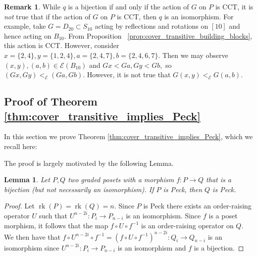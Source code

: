 \documentclass[10 pt]{amsart}
\theoremstyle{plain}
\newtheorem{lem}[thm]{Lemma}
\theoremstyle{definition}
\newtheorem{rem}[thm]{Remark}
\theoremstyle{remark}
\numberwithin{equation}{section}
\newcommand\ssec{\subsection}
\newcommand\rk{\operatorname{rk}}
\begin{document}
\begin{rem}
While $q$ is a bijection if and only if the action of $G$ on $P$ is CCT, it is {\it not} true that if the action of $G$ on $P$ is CCT, then $q$ is an isomorphism.  For example, take $G=D_{20} \subset S_{10}$ acting by reflections and rotations on $[10]$ and hence acting on $B_{10}.$ From Proposition ~\ref{prop:cover_transitive_building_blocks}, this action is CCT. However, consider $x = \{2,4\},y = \{1,2,4\},a = \{2,4,7\},b = \{2,4,6,7\}.$ Then we may observe $(x , y),(a, b) \in \mathcal E(B_{10})$ and $Gx < Ga, Gy < Gb,$ so $(Gx, Gy) <_{\mathcal E} (Ga, Gb).$ However, it is not true that $G(x, y)<_{\mathcal E} G(a,b)$.
\end{rem}

\ssec{Proof of Theorem \ref{thm:cover_transitive_implies_Peck}}\label{ssec:proof_of_cover_transitive_implies_Peck}

In this section we prove Theorem \ref{thm:cover_transitive_implies_Peck}, which we recall here:

\cctpeck*

The proof is largely motivated by the following Lemma.

\begin{lem}\label{lem:bijection_peck_implication}
Let $P,Q$ two graded posets with a morphism $f:P\rightarrow Q$ that is a bijection (but not necessarily an isomorphism). If $P$ is Peck, then $Q$ is Peck.
\end{lem}
\begin{proof}
Let $\rk(P) = \rk(Q) = n$.  Since $P$ is Peck there exists an order-raising operator $U$ such that $U^{n-2i}\colon P_i\rightarrow P_{n-i}$ is an isomorphism.  Since $f$ is a poset morphism, it follows that the map $f\circ U\circ f^{-1}$ is an order-raising operator on $Q$.  We then have that $f\circ U^{n-2i}\circ f^{-1} = \left(f\circ U\circ f^{-1}\right)^{n-2i}\colon Q_i\rightarrow Q_{n-i}$ is an isomorphism since $U^{n-2i}\colon P_i\rightarrow P_{n-i}$ is an isomorphism and $f$ is a bijection.

\end{proof}
\end{document}
